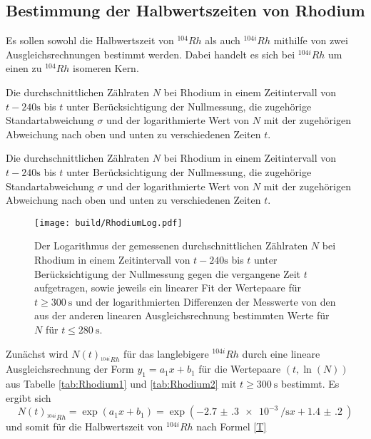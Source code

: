 \subsection{Bestimmung der Halbwertszeiten von Rhodium}
Es sollen sowohl die Halbwertszeit von $^{104} Rh$ als auch $^{104i} Rh$ mithilfe von zwei Ausgleichsrechnungen bestimmt werden. Dabei handelt es sich bei $^{104i} Rh$ um einen zu $^{104} Rh$ isomeren Kern.
 \begin{table}
	\centering
	\caption{Die durchschnittlichen Zählraten $N$ bei Rhodium in einem Zeitintervall von $t-240\si{\second}$ bis $t$ unter Berücksichtigung der Nullmessung, die zugehörige Standartabweichung $\sigma$ und der logarithmierte Wert von $N$ mit der zugehörigen Abweichung nach oben und unten zu verschiedenen Zeiten $t$.}
	
\end{table}
\begin{table}
	\centering
	\caption{Die durchschnittlichen Zählraten $N$ bei Rhodium in einem Zeitintervall von $t-240\si{\second}$ bis $t$ unter Berücksichtigung der Nullmessung, die zugehörige Standartabweichung $\sigma$ und der logarithmierte Wert von $N$ mit der zugehörigen Abweichung nach oben und unten zu verschiedenen Zeiten $t$.}
	
\end{table}
\begin{figure}
	\centering
	\caption{Der Logarithmus der gemessenen durchschnittlichen Zählraten $N$ bei Rhodium in einem Zeitintervall von $t-240\si{\second}$ bis $t$ unter Berücksichtigung der Nullmessung gegen die vergangene Zeit $t$ aufgetragen, sowie jeweils ein linearer Fit der Wertepaare für $t\ge \SI{300}{\second}$ und der logarithmierten Differenzen der Messwerte von den aus der anderen linearen Ausgleichsrechnung bestimmten Werte für $N$ für $t\le \SI{280}{\second}$.}
	\texttt{[image: build/RhodiumLog.pdf]}
	\label{fig:Rhodium}
\end{figure}
Zunächst wird $N(t)_{^{104i}Rh}$ für das langlebigere $^{104i} Rh$ durch eine lineare Ausgleichsrechnung der Form $y_1=a_1 x+b_1$ für die Wertepaare $(t,\ln(N))$ aus Tabelle \ref{tab:Rhodium1} und \ref{tab:Rhodium2} mit $t\ge \SI{300}{\second}$ bestimmt.
Es ergibt sich
\begin{equation}
	N(t)_{^{104i}Rh} = \exp\left(a_1 x + b_1\right) = \exp\left(-\SI{2.7(3)e-3}{\per\second} x + \SI{1.4(2)}{}\right)
\end{equation}
und somit für die Halbwertszeit von $^{104i} Rh$ nach Formel \eqref{T}
